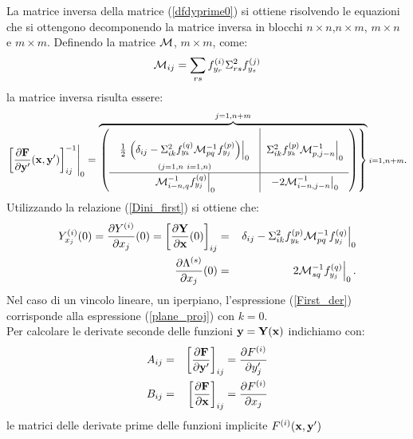 La matrice inversa della matrice (\ref{dfdyprime0}) si ottiene risolvendo le
equazioni che si ottengono decomponendo la matrice inversa in blocchi $n\times n$,$n\times m$, $m\times n$ e $m\times m$. Definendo la matrice ${\cal M}$, $m\times m$, come:
\begin{equation}
\label{Mmatrix}
{\cal M}_{ij}=\sum_{rs}f^{(i)}_{y_r}\Sigma^2_{rs}f^{(j)}_{y_s}
\end{equation}
la matrice inversa risulta essere:
\begin{equation}
\label{dfdyinv}
\left.\left[\frac{\partial{\bf F}}{\partial{\bf y}^\prime}({\bf x},{\bf y}^\prime)\right]^{-1}_{ij}\right|_0=\overbrace{\left.\left(\begin{array}{c|c}\mbox{$\begin{array}{c} \\\frac{1}{2}\left.\left(\delta_{ij}-{\Sigma^2_{ik}f^{(q)}_{y_k}{\cal M}^{-1}_{pq}f^{(p)}_{y_j}}\right)\right|_0\\{\scriptstyle (j=1,n\ i=1,n)} \end{array}$}&\left.{\Sigma^2_{ik}f^{(p)}_{y_k}{\cal M}^{-1}_{p,j-n}}\right|_0\\ \hline\left.{\cal M}^{-1}_{i-n,q}{f^{(q)}_{y_j}}\right|_0 &\left.-2{\cal M}^{-1}_{i-n,j-n}\right|_0\end{array}\right)\right\}}^{j=1,n+m}{\scriptstyle i=1,n+m}.
\end{equation}
Utilizzando la relazione (\ref{Dini_first}) si ottiene che:
\begin{eqnarray}
\label{First_der}
Y^{(i)}_{x_j}(0)=\frac{\partial Y^{(i)}}{\partial x_j}(0)=\left[\frac{\partial{\bf Y}}{\partial{\bf x}}(0)\right]_{ij}&=&\left.\delta_{ij}-\Sigma^2_{ik}f^{(p)}_{y_k}{\cal M}^{-1}_{pq}f^{(q)}_{y_j}\right|_0\\
\frac{\partial\Lambda^{(s)}}{\partial x_j}(0)&=&\left.2{\cal M}^{-1}_{sq}f^{(q)}_{y_j}\right|_0.
\end{eqnarray}
Nel caso di un vincolo lineare, un iperpiano, l'espressione (\ref{First_der}) corrisponde alla espressione (\ref{plane_proj}) con $k=0$.\\Per calcolare le derivate seconde delle funzioni ${\bf y}={\bf Y}({\bf x})$ indichiamo
con:
\begin{eqnarray*}
A_{ij}&=&\left[\frac{\partial {\bf F}}{\partial {\bf y}^\prime}\right]_{ij}=\frac{\partial F^{(i)}}{\partial y^\prime_j}\\
B_{ij}&=&\left[\frac{\partial {\bf F}}{\partial {\bf x}}\right]_{ij}=\frac{\partial F^{(i)}}{\partial x_j}
\end{eqnarray*}
le matrici delle derivate prime delle funzioni implicite $F^{(i)}({\bf x},{\bf y}^\prime)$
